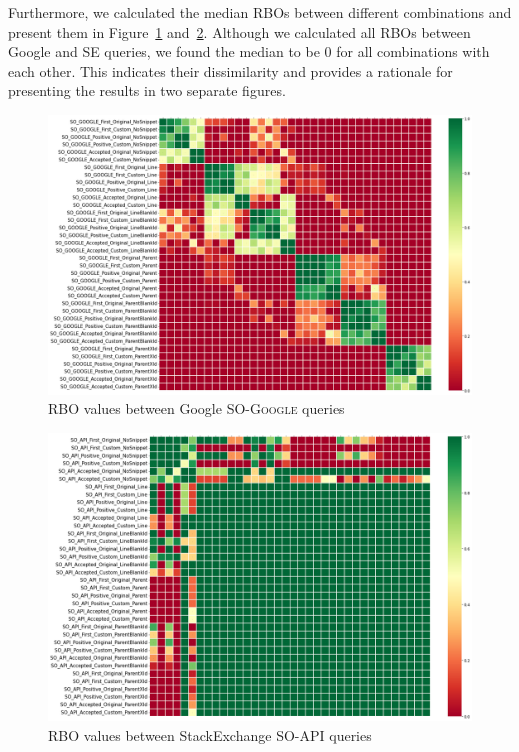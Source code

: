 \documentclass[preprint,12pt]{elsarticle}
\begin{document}
Furthermore, we calculated the median RBOs between different combinations and present them in Figure~\ref{fig: rbog} and~\ref{fig: rbos}. Although we calculated all RBOs between Google and SE queries, we found the median to be 0 for all combinations with each other. This indicates their dissimilarity and provides a rationale for presenting the results in two separate figures.

\begin{figure}[h]
\centering
\includegraphics[width=\linewidth]{Figures/NEW_result_rbo_g.png}
\caption{RBO values between Google \textsc{SO-Google} queries}
\label{fig: rbog}
\end{figure}

\begin{figure}[h]
\centering
\includegraphics[width=\linewidth]{Figures/NEW_result_rbo_s.png}
\caption{RBO values between StackExchange \textsc{SO-API} queries}
\label{fig: rbos}
\end{figure}
\end{document}
